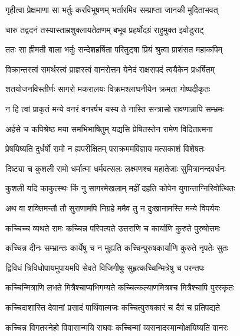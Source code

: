 \twolineshloka
{गृहीत्वा प्रेक्षमाणा सा भर्तुः करविभूषणम्}
{भर्तारमिव सम्प्राप्ता जानकी मुदिताभवत्} %

\twolineshloka
{चारु तद्वदनं तस्यास्ताम्रशुक्लायतेक्षणम्}
{बभूव प्रहर्षोदग्रं राहुमुक्त इवोडुराट्} %

\twolineshloka
{ततः सा ह्रीमती बाला भर्तुः सन्देशहर्षिता}
{परितुट्षा प्रियं श्रुत्वा प्राशंसत महाकपिम्} %

\twolineshloka
{विक्रान्तस्त्वं समर्थस्त्वं प्राज्ञस्त्वं वानरोत्तम}
{येनेदं राक्षसपदं त्वयैकेन प्रधर्षितम्} %

\twolineshloka
{शतयोजनविस्तीर्णः सागरो मकरालयः}
{विक्रमश्लाघनीयेन क्रमता गोष्पदीकृतः} %

\twolineshloka
{न हि त्वां प्राकृतं मन्ये वनरं वनरर्षभ}
{यस्य ते नास्ति सन्त्रासो रावणान्नापि सम्भ्रमः} %

\twolineshloka
{अर्हसे च कपिश्रेष्ठ मया समभिभाषितुम्}
{यद्यसि प्रेषितस्तेन रामेण विदितात्मना} %

\twolineshloka
{प्रेषयिष्यति दुर्धर्षो रामो न ह्यपरीक्षितम्}
{पराक्रममविज्ञाय मत्सकाशं विशेषतः} %

\twolineshloka
{दिष्ट्या च कुशली रामो धर्मात्मा धर्मवत्सलः}
{लक्ष्मणश्च महातेजाः सुमित्रानन्दवर्धनः} %

\twolineshloka
{कुशली यदि काकुत्स्थः किं नु सागरमेखलाम्}
{महीं दहति कोपेन युगान्ताग्निरिवोत्थितः} %

\twolineshloka
{अथ वा शक्तिमन्तौ तौ सुराणामपि निग्रहे}
{ममैव तु न दुःखानामस्ति मन्ये विपर्ययः} %

\twolineshloka
{कच्चिच्च व्यथते रामः कच्चिन्न परिपत्यते}
{उत्तराणि च कार्याणि कुरुते पुरुषोत्तमः} %

\twolineshloka
{कच्चिन्न दीनः सम्भ्रान्तः कार्येषु च न मुह्यति}
{कच्चिन्पुरुषकार्याणि कुरुते नृपतेः सुतः} %

\twolineshloka
{द्विविधं त्रिविधोपायमुपायमपि सेवते}
{विजिगीषुः सुहृत्कच्चिन्मित्रेषु च परन्तपः} %

\twolineshloka
{कच्चिन्मित्राणि लभते मित्रैश्चाप्यभिगम्यते}
{कच्चित्कल्याणमित्रश्च मित्रैश्चापि पुरस्कृतः} %

\twolineshloka
{कच्चिदाशास्ति देवानां प्रसादं पार्थिवात्मजः}
{कच्चित्पुरुषकारं च दैवं च प्रतिपद्यते} %

\twolineshloka
{कच्चिन्न विगतस्नेहो विवासान्मयि राघवः}
{कच्चिन्मां व्यसनादस्मान्मोक्षयिष्यति वानरः} %


